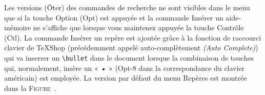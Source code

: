 \documentclass[11pt,french]{article}
\newcommand{\optkey}{\textsf{Opt}}
\newcommand{\ctlkey}{\textsf{Ctl}}
\newcommand{\cmdkey}{\textsf{Cmd}}
\newcommand{\mnu}[1]{\textsf{#1}}
\newcommand{\To}{\,\(\to\)\,}
\newcommand{\TS}{\textsf{\TeX Shop}}
\newcommand{\CCT}{\textsf{CommandCompletion.txt}}
\begin{document}
Les versions \mnu{(Ôter)} des commandes de recherche ne sont visibles dans le menu que si la touche Option (\optkey) est appuyée et la commande \mnu{Insérer un aide-mémoire} ne s'affiche que lorsque vous maintenez appuyée la touche Contrôle (\ctlkey). La commande \mnu{Insérer un repère} est ajoutée grâce à la fonction de raccourci clavier de \TS{} (précédemment appelé auto-complètement \emph{(Auto Complete)}) qui va inserrer un \texttt{\textbackslash bullet} dans le document lorsque la combinaison de touches qui, normalement, insère un « • » (\mnu{\optkey-8} dans la correspondance du clavier américain) est employée. La version par défaut du menu \mnu{Repères} est montrée dans la \textsc{Figure}~.  
\end{document}
